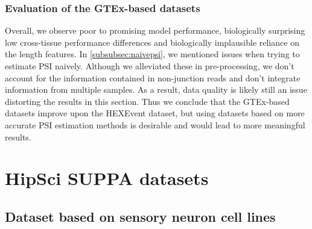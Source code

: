 
\subsubsection{Evaluation of the GTEx-based datasets}
Overall, we observe poor to promising model performance, biologically surprising low cross-tissue performance differences and biologically implausible reliance on the length features. 
In \ref{subsubsec:naivepsi}, we mentioned issues when trying to estimate PSI naively. Although we alleviated these in pre-processing, we don't account for the information contained in non-junction reads and don't integrate information from multiple samples. As a result, data quality is likely still an issue distorting the results in this section. 
Thus we conclude that the GTEx-based datasets improve upon the HEXEvent dataset, but using datasets based on more accurate PSI estimation methods is desirable and would lead to more meaningful results. %





\section{HipSci SUPPA datasets} \label{subsec:hipsci_suppa}
\subsection{Dataset based on sensory neuron cell lines}

